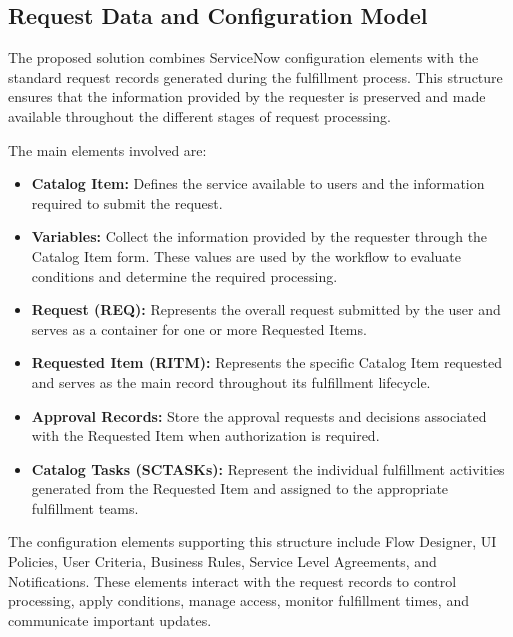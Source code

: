 \documentclass[12pt,a4paper]{report}
\begin{document}
\subsection{Request Data and Configuration Model}

The proposed solution combines ServiceNow configuration elements with the
standard request records generated during the fulfillment process. This
structure ensures that the information provided by the requester is preserved
and made available throughout the different stages of request processing.

The main elements involved are:

\begin{itemize}

    \item \textbf{Catalog Item:} Defines the service available to users and
    the information required to submit the request.

    \item \textbf{Variables:} Collect the information provided by the requester
    through the Catalog Item form. These values are used by the workflow to
    evaluate conditions and determine the required processing.

    \item \textbf{Request (REQ):} Represents the overall request submitted by
    the user and serves as a container for one or more Requested Items.

    \item \textbf{Requested Item (RITM):} Represents the specific Catalog Item
    requested and serves as the main record throughout its fulfillment
    lifecycle.

    \item \textbf{Approval Records:} Store the approval requests and decisions
    associated with the Requested Item when authorization is required.

    \item \textbf{Catalog Tasks (SCTASKs):} Represent the individual
    fulfillment activities generated from the Requested Item and assigned to
    the appropriate fulfillment teams.

\end{itemize}

The configuration elements supporting this structure include Flow Designer,
UI Policies, User Criteria, Business Rules, Service Level Agreements, and
Notifications. These elements interact with the request records to control
processing, apply conditions, manage access, monitor fulfillment times, and
communicate important updates.
\end{document}
